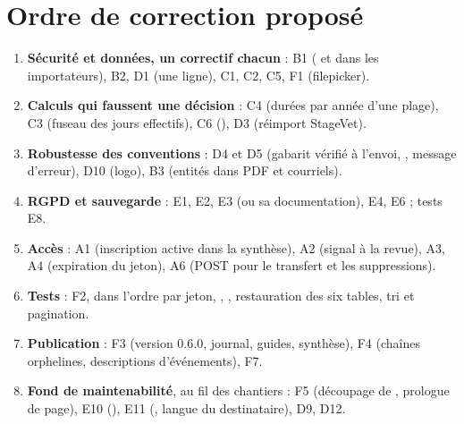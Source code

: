\documentclass[11pt,a4paper]{article}
\begin{document}
\section{Ordre de correction proposé}

\begin{enumerate}[itemsep=2pt]
  \item \textbf{Sécurité et données, un correctif chacun} : B1 ( et
     dans les importateurs), B2, D1 (une ligne), C1, C2, C5, F1 (filepicker).
  \item \textbf{Calculs qui faussent une décision} : C4 (durées par année d'une plage), C3
    (fuseau des jours effectifs), C6 (), D3 (réimport StageVet).
  \item \textbf{Robustesse des conventions} : D4 et D5 (gabarit vérifié à l'envoi,
    , message d'erreur), D10 (logo), B3 (entités dans PDF et courriels).
  \item \textbf{RGPD et sauvegarde} : E1, E2, E3 (ou sa documentation), E4, E6 ; tests E8.
  \item \textbf{Accès} : A1 (inscription active dans la synthèse), A2 (signal à la revue), A3,
    A4 (expiration du jeton), A6 (POST pour le transfert et les suppressions).
  \item \textbf{Tests} : F2, dans l'ordre  par jeton,
    , , restauration des six tables, tri et pagination.
  \item \textbf{Publication} : F3 (version 0.6.0, journal, guides, synthèse), F4 (chaînes
    orphelines, descriptions d'événements), F7.
  \item \textbf{Fond de maintenabilité}, au fil des chantiers : F5 (découpage de
    , prologue de page), E10 (), E11
    (, langue du destinataire), D9, D12.
\end{enumerate}
\end{document}
